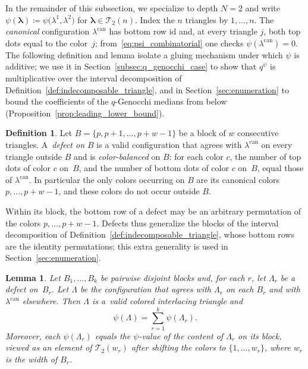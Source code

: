 \documentclass[pdftex]{sigma}
\numberwithin{equation}{section}
\newtheorem{Lemma}[Theorem]{Lemma}
\theoremstyle{definition}
\newtheorem{Definition}[Theorem]{Definition}
\begin{document}
In the remainder of this subsection, we specialize to depth $N=2$ and
write $\psi(\boldsymbol\lambda)\coloneqq\psi\bigl(\lambda^1,\lambda^2\bigr)$ for
$\boldsymbol\lambda\in\mathcal{T}_2(n)$.
Index the $n$ triangles by $1,\dots,n$.
The \emph{canonical} configuration $\lambda^{\mathrm{can}}$ has bottom row
$\mathrm{id}$ and, at every triangle $j$, both top dots equal to the color~$j$; from~\eqref{eq:psi_combinatorial} one checks
$\psi(\lambda^{\mathrm{can}})=0$.
The following definition and lemma isolate a gluing mechanism under which
$\psi$ is additive; we use it in Section~\ref{subsec:q_genocchi_case} to show
that $q^{\psi}$ is multiplicative over the interval decomposition of
Definition~\ref{def:indecomposable_triangle}, and in Section~\ref{sec:enumeration} to
bound the coefficients of the $q$-Genocchi medians from below
(Proposition~\ref{prop:leading_lower_bound}).

\begin{Definition}
	\label{def:block_defect}
	Let $B=\{p,p+1,\dots,p+w-1\}$ be a block of $w$ consecutive triangles. A~\emph{defect on $B$} is a valid configuration that agrees with
	$\lambda^{\mathrm{can}}$ on every triangle outside $B$ and is
	\emph{color-balanced} on $B$: for each color $c$, the number of top dots
	of color $c$ on~$B$, and the number of bottom dots of color $c$ on~$B$,
	equal those of $\lambda^{\mathrm{can}}$. In particular the only colors
	occurring on $B$ are its canonical colors $p,\dots,p+w-1$, and these colors
	do not occur outside $B$.
\end{Definition}

Within its block, the bottom row of a defect may be an arbitrary permutation of the colors $p,\dots,p+w-1$.  Defects thus generalize the blocks of the interval decomposition of Definition~\ref{def:indecomposable_triangle}, whose bottom rows are the identity permutations; this extra generality is used in Section~\ref{sec:enumeration}.

\begin{Lemma}\label{lem:defect_additivity}
	Let $B_1,\dots,B_k$ be pairwise disjoint blocks and, for each $r$, let
	$\Lambda_r$ be a defect on~$B_r$. Let $\Lambda$ be the configuration that
	agrees with $\Lambda_r$ on each $B_r$ and with $\lambda^{\mathrm{can}}$
	elsewhere. Then $\Lambda$ is a~valid colored interlacing triangle and
	\begin{equation}
		\label{eq:defect_additivity}
		\psi(\Lambda)=\sum_{r=1}^{k}\psi(\Lambda_r).
	\end{equation}
	Moreover, each $\psi(\Lambda_r)$ equals the $\psi$-value of the content
	of $\Lambda_r$ on its block, viewed as an element of
	$\mathcal{T}_2(w_r)$ after shifting the colors to $\{1,\dots,w_r\}$,
	where $w_r$ is the width of $B_r$.
\end{Lemma}
\end{document}
